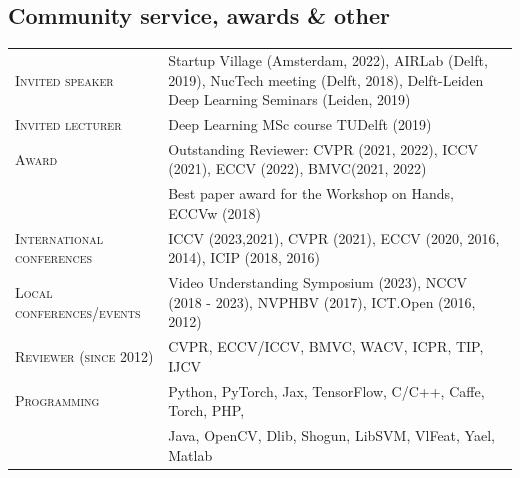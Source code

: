 \documentclass[a4paper, oneside, final]{scrartcl}
\begin{document}
\begin{center}
		\section{Community service, awards \& other}
        \begin{tabular}{p{4.5cm}@{\hskip 0.3in}p{11.3cm}}
            \textsc{Invited speaker}            & Startup Village (Amsterdam, 2022), AIRLab (Delft, 2019), NucTech meeting (Delft, 2018), Delft-Leiden Deep Learning Seminars (Leiden, 2019)\\
            \textsc{Invited lecturer}           & Deep Learning MSc course TUDelft (2019)\\
            \textsc{Award}                      & Outstanding Reviewer: CVPR (2021, 2022), ICCV (2021), ECCV (2022), BMVC(2021, 2022)\\ 
                                                & Best paper award for the Workshop on Hands, ECCVw (2018)\\  
            \textsc{International conferences}  & ICCV (2023,2021), CVPR (2021), ECCV (2020, 2016, 2014), ICIP (2018, 2016)\\
            \textsc{Local conferences\slash events} & Video Understanding Symposium (2023), NCCV (2018 - 2023), NVPHBV (2017), ICT.Open (2016, 2012)\\
            \textsc{Reviewer (since 2012)}      & CVPR, ECCV/ICCV, BMVC, WACV, ICPR, TIP, IJCV\\
			\textsc{Programming}                & Python, PyTorch, Jax, TensorFlow, C\slash C++, Caffe, Torch, PHP,\\ 
			                                    & Java, OpenCV, Dlib, Shogun, LibSVM, VlFeat, Yael, Matlab\\
		\end{tabular}

\end{center}
\end{document}
